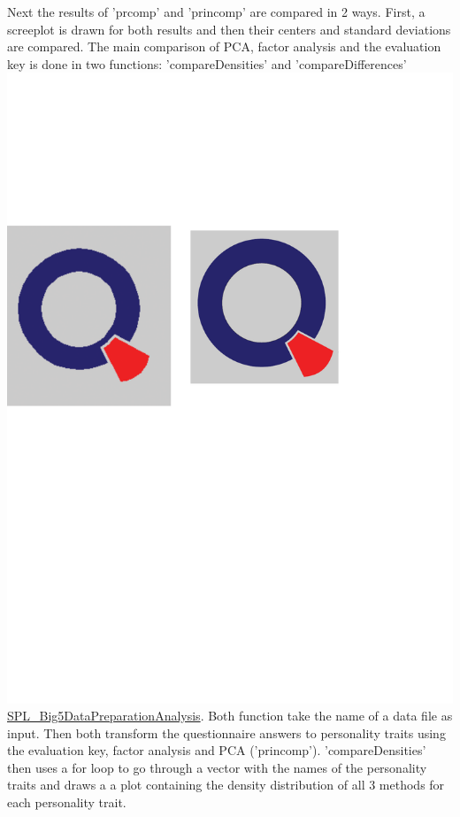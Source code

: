 \newline
Next the results of 'prcomp' and 'princomp' are compared in 2 ways. First, a screeplot is drawn for both results and then their centers and standard deviations are compared.
\newline
The main comparison of PCA, factor analysis and the evaluation key is done in two functions: 'compareDensities' and 'compareDifferences' \href{https://github.com/Matthias2193/SPL/blob/f6c320279a478642e8a87020ac48029a48624933/SPL_Big5DataPreparationAnalysis/SPL_Big5DataPreparationAnalysis.R#L78-L117}{\includegraphics[scale = 0.06]{Figures/qletlogo.pdf}SPL\_Big5DataPreparationAnalysis}. Both function take the name of a data file as input. Then both transform the questionnaire answers to personality traits using the evaluation key, factor analysis and PCA ('princomp'). 'compareDensities' then uses a for loop to go through a vector with the names of the personality traits and draws a a plot containing the density distribution of all 3 methods for each personality trait.
